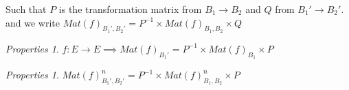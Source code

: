\documentclass{article}
\theoremstyle{definition}
\theoremstyle{remark}
\newtheorem{prop}[theorem]{Properties}
\numberwithin{equation}{section}
\begin{document}
Such that $P$ is the transformation matrix from $B_{1} \to B_{2}$ and $Q$ from $B_{1}' \to B_{2}'$.\\
and we write ${Mat(f)}_{B_{1}', B_{2}'} = P^{-1}\times {Mat(f)}_{B_{1}, B_2}\times Q$


\begin{prop}
    $f : E \to E \implies {Mat(f)}_{B_{1}'} = P^{-1}\times {Mat(f)}_{B_{1}}\times P$
\end{prop}

\begin{prop}
    ${Mat(f)}_{B_{1}', B_{2}'}^n = P^{-1}\times {Mat(f)}^n_{B_{1}, B_{2}}\times P$
\end{prop}
\end{document}
